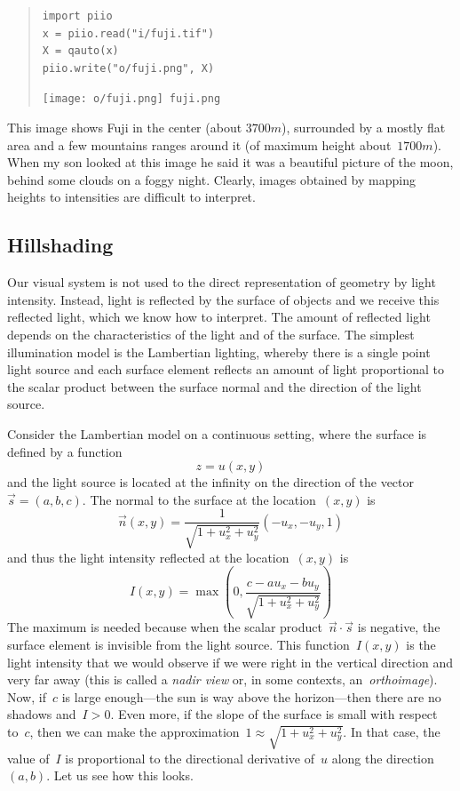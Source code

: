\begin{quote}
\begin{verbatim}
import piio
x = piio.read("i/fuji.tif")
X = qauto(x)
piio.write("o/fuji.png", X)
\end{verbatim}
\texttt{[image: o/fuji.png]}~\verb+fuji.png+
\end{quote}

This image shows Fuji in the center (about $3700m$), surrounded by a mostly
flat area and a few mountains ranges around it (of maximum height
about~$1700m$).  When my son looked at this image he said it was a beautiful
picture of the moon, behind some clouds on a foggy night.  Clearly, images
obtained by mapping heights to intensities are difficult to interpret.


\subsection{Hillshading}

Our visual system is not used to the direct representation of geometry by
light intensity.
Instead, light is reflected by the surface of objects and we
receive this reflected light, which we know how to interpret.  The amount of
reflected light depends on the characteristics of the light and of the
surface.  The simplest
illumination model is the Lambertian lighting, whereby there is a single
point light source and each surface element reflects an amount of light
proportional to the scalar product between the surface normal and the
direction of the light source.

Consider the Lambertian model on a continuous setting, where the surface is
defined by a function~\[z=u(x,y)\] and the light source is located at the
infinity on the direction of the vector~$\vec s = (a,b,c)$.  The normal to
the surface at the location~$(x,y)$ is
\[
	\vec n(x,y) = \frac{1}{\sqrt{1+u_x^2+u_y^2}}\left(-u_x, -u_y, 1\right)
\]
and thus the light intensity reflected at the location~$(x,y)$ is
\[
	I(x,y) = \max\left(0, 
		\frac{c - au_x - bu_y}{\sqrt{1+u_x^2+u_y^2}}
	\right)
\]
The maximum is needed because when the scalar product~$\vec n\cdot\vec s$ is
negative, the surface element is invisible from the light source.  This
function~$I(x,y)$ is the light intensity that we would observe if we were
right in the vertical direction and very far away (this is called a
\emph{nadir view} or, in some contexts, an~\emph{orthoimage}).  Now, if~$c$
is large enough---the sun is way above the horizon---then there are no
shadows and~$I>0$.  Even more, if the slope of the surface is small with
respect to~$c$, then we can make the
approximation~$1\approx\sqrt{1+u_x^2+u_y^2}$.  In that case, the value of~$I$
is proportional to the directional derivative of~$u$ along the
direction~$(a,b)$.  Let us see how this looks.

